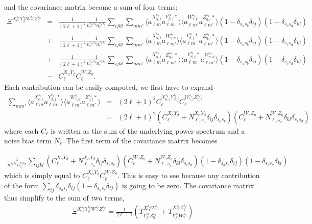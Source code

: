 \documentclass[a4paper, 11pt]{article}
\def\ba{\begin{eqnarray}}
\def\ea{\end{eqnarray}}
\begin{document}
and the covariance matrix become a sum of four terms:
\ba
\Xi^{X^{s_{a}}_{\alpha} Y^{s_{b}}_{\beta} W^{s_{c}}_{\gamma} Z^{s_{d}}_{\eta}}   &=&  \frac{1}{(2\ell +1)^{2}}  \frac{1}{n^{s_{a} s_{b}}_{c} n^{s_{c} s_{d}}_{c}} \sum_{ijkl}   \sum_{mm'}\langle a^{X^{s_{a}}_{\alpha, i} }_{\ell m}  a^{Y^{s_{b}}_{\beta, j}*}_{\ell m} \rangle \langle a^{W^{s_{c}}_{\gamma, k} }_{\ell m'}  a^{Z^{s_{d}}_{\eta, l}*}_{\ell m'} \rangle(1-\delta_{s_{a}s_{b}}\delta_{ij}) (1-\delta_{s_{c}s_{d}}\delta_{kl}) \nonumber \\
&+&  \frac{1}{(2\ell +1)^{2}}  \frac{1}{n^{s_{a} s_{b}}_{c} n^{s_{c} s_{d}}_{c}} \sum_{ijkl}   \sum_{mm'} \langle a^{X^{s_{a}}_{\alpha, i} }_{\ell m}  a^{W^{s_{c}}_{\gamma, k} }_{\ell m'} \rangle \langle a^{Y^{s_{b}}_{\beta, j}*}_{\ell m}    a^{Z^{s_{d}}_{\eta, l}*}_{\ell m'} \rangle(1-\delta_{s_{a}s_{b}}\delta_{ij}) (1-\delta_{s_{c}s_{d}}\delta_{kl}) \nonumber \\
&+&   \frac{1}{(2\ell +1)^{2}}  \frac{1}{n^{s_{a} s_{b}}_{c} n^{s_{c} s_{d}}_{c}} \sum_{ijkl}   \sum_{mm'}   \langle a^{X^{s_{a}}_{\alpha, i} }_{\ell m}  a^{Z^{s_{d}}_{\eta,l}*}_{\ell m'} \rangle \langle a^{Y^{s_{b}}_{\beta, j}*}_{\ell m}  a^{W^{s_{c}}_{\gamma, k} }_{\ell m'}  \rangle (1-\delta_{s_{a}s_{b}}\delta_{ij}) (1-\delta_{s_{c}s_{d}}\delta_{kl}) \nonumber \\
&-&  C^{X_{\alpha} Y_{\beta}}_{\ell} C^{W_{\gamma} Z_{\eta}}_{\ell} .
\ea
Each contribution can be easily computed, we first have to expand
\ba
\sum_{mm'}  \langle a^{X^{s_{a}}_{\alpha, i} }_{\ell m}  a^{Y^{s_{b}}_{\beta, j}*}_{\ell m} \rangle \langle a^{W^{s_{c}}_{\gamma, k} }_{\ell m'}  a^{Z^{s_{d}}_{\eta, l}*}_{\ell m'} \rangle &=& (2\ell +1)^{2} C^{X^{s_{a}}_{\alpha, i} Y^{s_{b}}_{\beta, j}}_{\ell} C^{W^{s_{c}}_{\gamma, l} Z^{s_{d}}_{\eta, l}}_{\ell}  \nonumber \\
&=&   (2\ell +1)^{2} ( C^{X_{\alpha} Y_{\beta}}_{\ell} + N^{X_{\alpha} Y_{\beta}}_{\ell, s_{a}} \delta_{ij}\delta_{s_{a}s_{b}}) ( C^{W_{\gamma} Z_{\eta}}_{\ell} + N^{W_{\gamma} Z_{\eta}}_{\ell, s_{c}} \delta_{kl}\delta_{s_{c}s_{d}})
\ea
where each $C_{\ell}$ is written as the sum of the underlying power spectrum and a noise bias term $ N_{\ell}$. The first term of the covariance matrix becomes

\ba
\frac{1}{n^{s_{a} s_{b}}_{c} n^{s_{c} s_{d}}_{c}} \sum_{ijkl}  ( C^{X_{\alpha} Y_{\beta}}_{\ell} + N^{X_{\alpha} Y_{\beta}}_{\ell, s_{a}} \delta_{ij}\delta_{s_{a}s_{b}}) ( C^{W_{\gamma} Z_{\eta}}_{\ell} + N^{W_{\gamma} Z_{\eta}}_{\ell, s_{c}} \delta_{kl}\delta_{s_{c}s_{d}})(1-\delta_{s_{a}s_{b}}\delta_{ij}) (1-\delta_{s_{c}s_{d}}\delta_{kl}) 
 \ea
 which is simply equal to $ C^{X_{\alpha} Y_{\beta}}_{\ell} C^{W_{\gamma} Z_{\eta}}_{\ell}$. This is easy to see because any contribution of the form  $\sum_{ij} \delta_{s_{a}s_{b}}\delta_{ij} (1-\delta_{s_{a}s_{b}}\delta_{ij})  $ is going to be zero. 
The covariance matrix thus simplify to the sum of two terms, 
\ba
\Xi^{X^{s_{a}}_{\alpha} Y^{s_{b}}_{\beta} W^{s_{c}}_{\gamma} Z^{s_{d}}_{\eta}}= \frac{1}{2\ell + 1} (T^{X^{s_{a}}_{\alpha} W^{s_{c}}_{\gamma}}_{Y^{s_{b}}_{\beta} Z^{s_{d}}_{\eta}} + T^{X^{s_{a}}_{\alpha} Z^{s_{d}}_{\eta}}_{Y^{s_{b}}_{\beta} W^{s_{c}}_{\gamma}})
\ea
\end{document}
